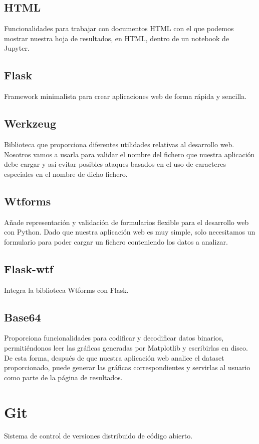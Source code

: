 \subsection{HTML}
Funcionalidades para trabajar con documentos HTML con el que podemos mostrar nuestra hoja de resultados, en HTML, dentro de un notebook de Jupyter.

\subsection{Flask}
Framework minimalista para crear aplicaciones web de forma rápida y sencilla.

\subsection{Werkzeug}
Biblioteca que proporciona diferentes utilidades relativas al desarrollo web. Nosotros vamos a usarla para validar el nombre del fichero que nuestra aplicación debe cargar y así evitar posibles ataques basados en el uso de caracteres especiales en el nombre de dicho fichero.

\subsection{Wtforms}
Añade representación y validación de formularios flexible para el desarrollo web con Python. Dado que nuestra aplicación web es muy simple, solo necesitamos un formulario para poder cargar un fichero conteniendo los datos a analizar.

\subsection{Flask-wtf}
Integra la biblioteca Wtforms con Flask.

\subsection{Base64}
Proporciona funcionalidades para codificar y decodificar datos binarios, permitiéndonos leer las gráficas generadas por Matplotlib y escribirlas en disco. De esta forma, después de que nuestra aplicación web analice el dataset proporcionado, puede generar las gráficas correspondientes y servirlas al usuario como parte de la página de resultados.

\section{Git}
Sistema de control de versiones distribuido de código abierto.

